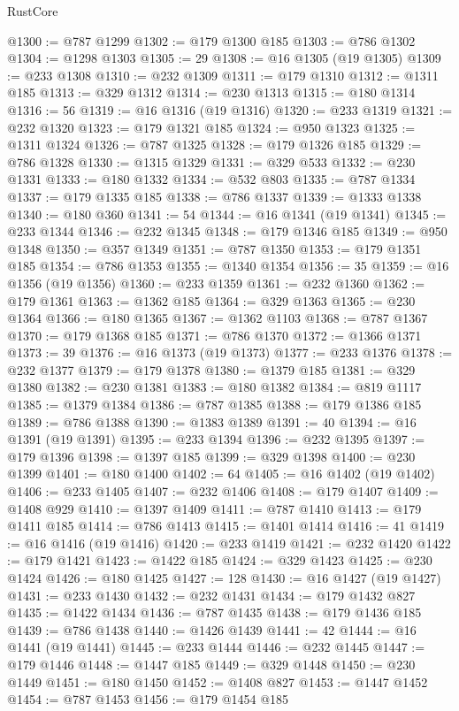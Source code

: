 \begin{lexlean}{RustCore}
\begin{coremodule}
@1300 := @787 @1299
@1302 := @179 @1300 @185
@1303 := @786 @1302
@1304 := @1298 @1303
@1305 := 29
@1308 := @16 @1305 (@19 @1305)
@1309 := @233 @1308
@1310 := @232 @1309
@1311 := @179 @1310
@1312 := @1311 @185
@1313 := @329 @1312
@1314 := @230 @1313
@1315 := @180 @1314
@1316 := 56
@1319 := @16 @1316 (@19 @1316)
@1320 := @233 @1319
@1321 := @232 @1320
@1323 := @179 @1321 @185
@1324 := @950 @1323
@1325 := @1311 @1324
@1326 := @787 @1325
@1328 := @179 @1326 @185
@1329 := @786 @1328
@1330 := @1315 @1329
@1331 := @329 @533
@1332 := @230 @1331
@1333 := @180 @1332
@1334 := @532 @803
@1335 := @787 @1334
@1337 := @179 @1335 @185
@1338 := @786 @1337
@1339 := @1333 @1338
@1340 := @180 @360
@1341 := 54
@1344 := @16 @1341 (@19 @1341)
@1345 := @233 @1344
@1346 := @232 @1345
@1348 := @179 @1346 @185
@1349 := @950 @1348
@1350 := @357 @1349
@1351 := @787 @1350
@1353 := @179 @1351 @185
@1354 := @786 @1353
@1355 := @1340 @1354
@1356 := 35
@1359 := @16 @1356 (@19 @1356)
@1360 := @233 @1359
@1361 := @232 @1360
@1362 := @179 @1361
@1363 := @1362 @185
@1364 := @329 @1363
@1365 := @230 @1364
@1366 := @180 @1365
@1367 := @1362 @1103
@1368 := @787 @1367
@1370 := @179 @1368 @185
@1371 := @786 @1370
@1372 := @1366 @1371
@1373 := 39
@1376 := @16 @1373 (@19 @1373)
@1377 := @233 @1376
@1378 := @232 @1377
@1379 := @179 @1378
@1380 := @1379 @185
@1381 := @329 @1380
@1382 := @230 @1381
@1383 := @180 @1382
@1384 := @819 @1117
@1385 := @1379 @1384
@1386 := @787 @1385
@1388 := @179 @1386 @185
@1389 := @786 @1388
@1390 := @1383 @1389
@1391 := 40
@1394 := @16 @1391 (@19 @1391)
@1395 := @233 @1394
@1396 := @232 @1395
@1397 := @179 @1396
@1398 := @1397 @185
@1399 := @329 @1398
@1400 := @230 @1399
@1401 := @180 @1400
@1402 := 64
@1405 := @16 @1402 (@19 @1402)
@1406 := @233 @1405
@1407 := @232 @1406
@1408 := @179 @1407
@1409 := @1408 @929
@1410 := @1397 @1409
@1411 := @787 @1410
@1413 := @179 @1411 @185
@1414 := @786 @1413
@1415 := @1401 @1414
@1416 := 41
@1419 := @16 @1416 (@19 @1416)
@1420 := @233 @1419
@1421 := @232 @1420
@1422 := @179 @1421
@1423 := @1422 @185
@1424 := @329 @1423
@1425 := @230 @1424
@1426 := @180 @1425
@1427 := 128
@1430 := @16 @1427 (@19 @1427)
@1431 := @233 @1430
@1432 := @232 @1431
@1434 := @179 @1432 @827
@1435 := @1422 @1434
@1436 := @787 @1435
@1438 := @179 @1436 @185
@1439 := @786 @1438
@1440 := @1426 @1439
@1441 := 42
@1444 := @16 @1441 (@19 @1441)
@1445 := @233 @1444
@1446 := @232 @1445
@1447 := @179 @1446
@1448 := @1447 @185
@1449 := @329 @1448
@1450 := @230 @1449
@1451 := @180 @1450
@1452 := @1408 @827
@1453 := @1447 @1452
@1454 := @787 @1453
@1456 := @179 @1454 @185

\end{coremodule}
\end{lexlean}
